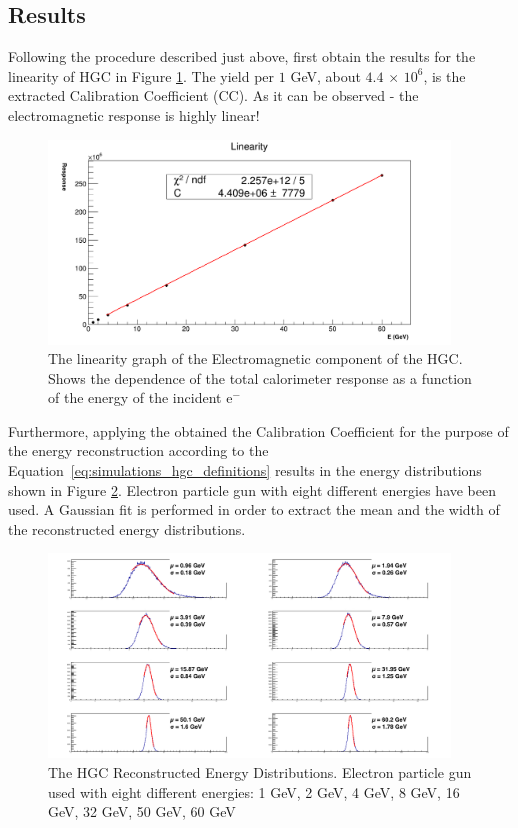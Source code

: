 \subsection{Results}
Following the procedure described just above, first obtain the results for the linearity of {\sc HGC} in Figure \ref{fig:simulations_hgc_pblinearity}. The yield per $1$ GeV, about $4.4$ $\times$ $10^6$, is the extracted Calibration Coefficient (CC). As it can be observed - the electromagnetic response is highly linear!
 \begin{figure}[htbp]
    \centering
    \includegraphics[width=0.95\textwidth]{figures/ch_simulations/hgc/performance/Pb/Linearity.png}
    \caption{The linearity graph of the Electromagnetic component of the {\sc HGC}. Shows the dependence of the total calorimeter response as a function of the energy of the incident e$^-$}
    \label{fig:simulations_hgc_pblinearity}
 \end{figure}

Furthermore, applying the obtained the Calibration Coefficient for the purpose of the energy reconstruction according to the Equation~\ref{eq:simulations_hgc_definitions} results in the energy distributions shown in Figure \ref{fig:simulations_hgc_pbenergyreco}. Electron particle gun with eight different energies have been used. A Gaussian fit is performed in order to extract the mean and the width of the reconstructed energy distributions.
\begin{figure}[htbp]
    \centering
    \includegraphics[width=0.95\textwidth]{figures/ch_simulations/hgc/performance/Pb/EnergyRECO.png}
    \caption{The {\sc HGC} Reconstructed Energy Distributions. Electron particle gun used with eight different energies: 1 GeV, 2 GeV, 4 GeV, 8 GeV, 16 GeV, 32 GeV, 50 GeV, 60 GeV}
    \label{fig:simulations_hgc_pbenergyreco}
 \end{figure}

